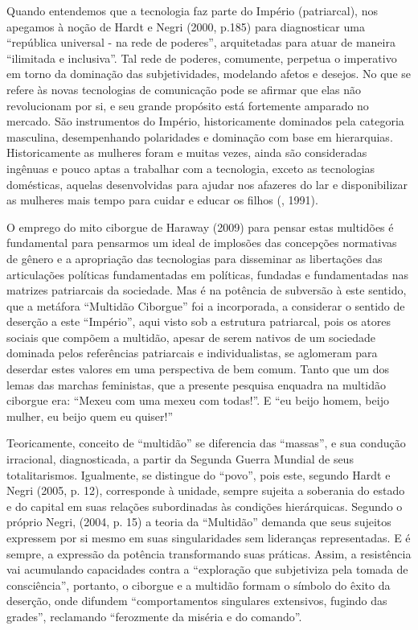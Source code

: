 Quando entendemos que a tecnologia faz parte do Império (patriarcal),
nos apegamos à noção de Hardt e Negri (2000, p.185) para diagnosticar
uma ``república universal - na rede de poderes'', arquitetadas para
atuar de maneira ``ilimitada e inclusiva''. Tal rede de poderes,
comumente, perpetua o imperativo em torno da dominação das
subjetividades, modelando afetos e desejos. No que se refere às novas
tecnologias de comunicação pode se afirmar que elas não revolucionam por
si, e seu grande propósito está fortemente amparado no mercado. São
instrumentos do Império, historicamente dominados pela categoria
masculina, desempenhando polaridades e dominação com base em
hierarquias. Historicamente as mulheres foram e muitas vezes, ainda são
consideradas ingênuas e pouco aptas a trabalhar com a tecnologia, exceto
as tecnologias domésticas, aquelas desenvolvidas para ajudar nos
afazeres do lar e disponibilizar as mulheres mais tempo para cuidar e
educar os filhos (, 1991).

O emprego do mito ciborgue de Haraway (2009) para pensar estas multidões
é fundamental para pensarmos um ideal de implosões das concepções
normativas de gênero e a apropriação das tecnologias para disseminar as
libertações das articulações políticas fundamentadas em políticas,
fundadas e fundamentadas nas matrizes patriarcais da sociedade. Mas é na
potência de subversão à este sentido, que a metáfora ``Multidão
Ciborgue'' foi a incorporada, a considerar o sentido de deserção a este
``Império'', aqui visto sob a estrutura patriarcal, pois os atores
sociais que compõem a multidão, apesar de serem nativos de um sociedade
dominada pelos referências patriarcais e individualistas, se aglomeram
para deserdar estes valores em uma perspectiva de bem comum. Tanto que
um dos lemas das marchas feministas, que a presente pesquisa enquadra na
multidão ciborgue era: ``Mexeu com uma mexeu com todas!''. E ``eu beijo
homem, beijo mulher, eu beijo quem eu quiser!''

Teoricamente, conceito de ``multidão'' se diferencia das ``massas'', e
sua condução irracional, diagnosticada, a partir da Segunda Guerra
Mundial de seus totalitarismos. Igualmente, se distingue do ``povo'',
pois este, segundo Hardt e Negri (2005, p. 12), corresponde à unidade,
sempre sujeita a soberania do estado e do capital em suas relações
subordinadas às condições hierárquicas. Segundo o próprio Negri, (2004,
p. 15) a teoria da ``Multidão'' demanda que seus sujeitos expressem por
si mesmo em suas singularidades sem lideranças representadas. E é
sempre, a expressão da potência transformando suas práticas. Assim, a
resistência vai acumulando capacidades contra a ``exploração que
subjetiviza pela tomada de consciência'', portanto, o ciborgue e a
multidão formam o símbolo do êxito da deserção, onde difundem
``comportamentos singulares extensivos, fugindo das grades'', reclamando
``ferozmente da miséria e do comando''.

